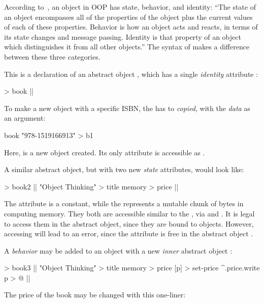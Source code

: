 According to~\citet{grady2007object}, an object in OOP has state, behavior, and identity:
``The state of an object encompasses all of the properties of
the object plus the current values of each of these properties.
Behavior is how an object acts and reacts, in terms of its state changes and message passing.
Identity is that property of an object which distinguishes it from all other objects.''
The syntax of \eo{} makes a difference between these three categories.

This is a declaration of an abstract object ,
which has a single \emph{identity} attribute :

\begin{ffcode}
[isbn] > book |$\label{ln:book}$|
\end{ffcode}

To make a new object with a specific ISBN, the 
has to \emph{copied}, with the \emph{data} as an argument:

\begin{ffcode}
book "978-1519166913" > b1
\end{ffcode}

Here,  is a new object created.
Its only attribute is accessible as .

A similar abstract object, but with two new \emph{state} attributes, would
look like:

\begin{ffcode}
[isbn] > book2  |$\label{ln:book2}$|
  "Object Thinking" > title
  memory > price |$\label{ln:book2-end}$|
\end{ffcode}

The attribute  is a constant, while the 
represents a mutable chunk of bytes in computing memory. They both are
accessible similar to the , via 
and . It is legal to access them in the abstract
object, since they are bound to objects. However, accessing 
will lead to an error, since the attribute  is free
in the abstract object .

A \emph{behavior} may be added to an object with a new \emph{inner}
abstract object :

\begin{ffcode}
[isbn] > book3 |$\label{ln:book3}$|
  "Object Thinking" > title
  memory > price
  [p] > set-price
    ^.price.write p > @ |$\label{ln:book3-end}$|
\end{ffcode}

The price of the book may be changed with this one-liner:

